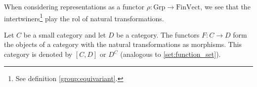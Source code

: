 	\begin{example}
	        When considering representations as a functor $\rho:\text{Grp}\rightarrow\text{FinVect}$, we see that the intertwiners\footnote{See definition \ref{group:equivariant}.} play the rol of natural transformations.
	\end{example}
	\begin{example}
		Let $C$ be a small category and let $D$ be a category. The functors $F:C\rightarrow D$ form the objects of a category with the natural transformations as morphisms. This category is denoted by $[C, D]$ or $D^C$ (analogous to \ref{set:function_set}).
	\end{example}
	

